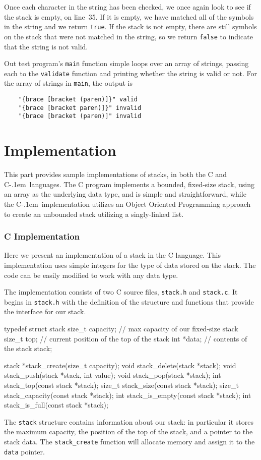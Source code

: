 \documentclass{article}
\newcommand{\Cpp}{\mbox{C\kern-.1em\raisebox{.35ex}{\smaller{\smaller{+\kern-0.05em+}}}}}
\begin{document}
  Once each character in the string has been checked, we once again look to see if the stack is empty, on line~35. If it is empty, we have matched all of the symbols in the string and we return \verb|true|. If the stack is not empty, there are still symbols on the stack that were not matched in the string, so we return \verb|false| to indicate that the string is not valid.

  Out test program's \verb|main| function simple loops over an array of strings, passing each to the \verb|validate| function and printing whether the string is valid or not. For the array of strings in \verb|main|, the output is
  \begin{verbatim}
    "{brace [bracket (paren)]}" valid
    "{brace [bracket paren)]}" invalid
    "{brace [bracket (paren)]" invalid
  \end{verbatim}

  \part{Implementation}\label{part:implementation}
  This part provides sample implementations of stacks, in both the C and \Cpp\ languages. The C program implements a bounded, fixed-size stack, using an array as the underlying data type, and is simple and straightforward, while the \Cpp\ implementation utilizes an Object Oriented Programming approach to create an unbounded stack utilizing a singly-linked list.
  \section{C Implementation}
  \label{sect:C_implementation}
  Here we present an implementation of a stack in the C language. This implementation uses simple integers for the type of data stored on the stack. The code can be easily modified to work with any data type.

  The implementation consists of two C source files, \verb|stack.h| and \verb|stack.c|. It begins in \verb|stack.h| with the definition of the structure and functions that provide the interface for our stack.
  \begin{lstc}[firstnumber=1]
typedef struct stack
{
  size_t  capacity; // max capacity of our fixed-size stack
  size_t  top;      // current position of the top of the stack
  int    *data;     // contents of the stack
} stack;

stack *stack_create(size_t capacity);
void stack_delete(stack *stack);
void stack_push(stack *stack, int value);
void stack_pop(stack *stack);
int stack_top(const stack *stack);
size_t stack_size(const stack *stack);
size_t stack_capacity(const stack *stack);
int stack_is_empty(const stack *stack);
int stack_is_full(const stack *stack);\end{lstc}
  The \verb|stack| structure contains information about our stack: in particular it stores the maximum capacity, the position of the top of the stack, and a pointer to the stack data. The \verb|stack_create| function will allocate memory and assign it to the \verb|data| pointer.
\end{document}
